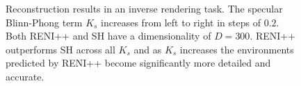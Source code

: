 \begin{figure}
{
  }
  \caption{Reconstruction results in an inverse rendering task. The specular Blinn-Phong term $K_{s}$ increases from left to right in steps of $0.2$. Both RENI++ and SH have a dimensionality of $D = 300$. RENI++ outperforms SH across all $K_{s}$ and as $K_{s}$ increases the environments predicted by RENI++ become significantly more detailed and accurate.}
  \label{fig:inverse_rendering}
\end{figure}